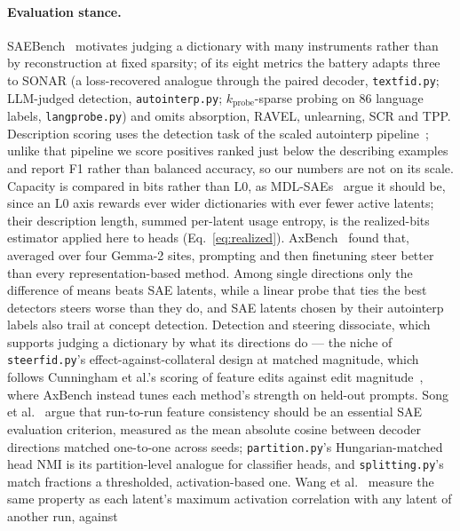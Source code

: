 \paragraph{Evaluation stance.}
SAEBench~\cite{karvonen2025} motivates judging a dictionary with many
instruments rather than by reconstruction at fixed sparsity; of its eight
metrics the battery adapts three to SONAR (a loss-recovered analogue
through the paired decoder, \texttt{textfid.py}; LLM-judged detection,
\texttt{autointerp.py}; $k_{\mathrm{probe}}$-sparse probing on 86
language labels, \texttt{langprobe.py}) and omits absorption, RAVEL,
unlearning, SCR and TPP. Description scoring uses the detection task of
the scaled autointerp pipeline~\cite{paulo2025}; unlike that pipeline we
score positives ranked just below the describing examples and report F1
rather than balanced accuracy, so our numbers are not on its scale.
Capacity is compared in bits rather than $\mathrm{L0}$, as
MDL-SAEs~\cite{ayonrinde2024} argue it should be, since an $\mathrm{L0}$
axis rewards ever wider dictionaries with ever fewer active latents; their
description length, summed per-latent usage entropy, is the realized-bits
estimator applied here to heads (Eq.~\eqref{eq:realized}).
AxBench~\cite{wu2025axbenchsteeringllmssimple} found that, averaged over
four Gemma-2 sites, prompting and then finetuning steer better than every
representation-based method. Among single directions only the difference
of means beats SAE latents, while a linear probe that ties the best
detectors steers worse than they do, and SAE latents chosen by their
autointerp labels also trail at concept detection. Detection and steering
dissociate, which supports judging a dictionary by what its directions do
--- the niche of \texttt{steerfid.py}'s
effect-against-collateral design at matched magnitude, which follows
Cunningham et al.'s scoring of feature edits against edit
magnitude~\cite{cunningham2023}, where AxBench instead tunes each method's
strength on held-out prompts. Song et
al.~\cite{song2025positionmechanisticinterpretabilityprioritize} argue
that run-to-run feature consistency should be an essential SAE evaluation
criterion, measured as the mean absolute cosine between decoder directions
matched one-to-one across seeds; \texttt{partition.py}'s Hungarian-matched
head NMI is its partition-level analogue for classifier heads, and
\texttt{splitting.py}'s match fractions a thresholded, activation-based
one. Wang et al.~\cite{wang2024} measure the same property as each latent's
maximum activation correlation with any latent of another run, against
